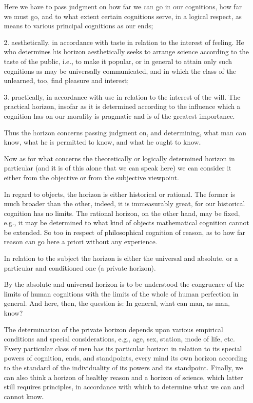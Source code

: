     Here we have to pass judgment on how far we can go in our cognitions,
    how far we must go, and to what extent certain cognitions serve,
    in a logical respect, as means to various principal cognitions as our ends;

    2. aesthetically, in accordance with taste
    in relation to the interest of feeling.
    He who determines his horizon aesthetically seeks
    to arrange science according to the taste of the public,
    i.e., to make it popular,
    or in general to attain only such cognitions
    as may be universally communicated,
    and in which the class of the unlearned, too,
    find pleasure and interest;

    3. practically, in accordance with use
    in relation to the interest of the will.
    The practical horizon, insofar as it is determined
    according to the influence which a cognition has
    on our morality is pragmatic
    and is of the greatest importance.

    Thus the horizon concerns passing judgment on,
    and determining,
    what man can know,
    what he is permitted to know,
    and what he ought to know.

    Now as for what concerns the theoretically
    or logically determined horizon in particular
    (and it is of this alone that we can speak here)
    we can consider it either from the objective
    or from the subjective viewpoint.

    In regard to objects, the horizon is either historical or rational.
    The former is much broader than the other,
    indeed, it is immeasurably great,
    for our historical cognition has no limits.
    The rational horizon, on the other hand, may be fixed,
    e.g., it may be determined to what kind of objects
    mathematical cognition cannot be extended.
    So too in respect of philosophical cognition of reason,
    as to how far reason can go here a priori without any experience.

    In relation to the subject the horizon is
    either the universal and absolute,
    or a particular and conditioned one (a private horizon).

    By the absolute and universal horizon is to be understood
    the congruence of the limits of human cognitions with
    the limits of the whole of human perfection in general.
    And here, then, the question is:
    In general, what can man, as man, know?

    The determination of the private horizon depends upon
    various empirical conditions and special considerations,
    e.g., age, sex, station, mode of life, etc.
    Every particular class of men has its particular horizon
    in relation to its special powers of cognition, ends, and standpoints,
    every mind its own horizon according to the standard of
    the individuality of its powers and its standpoint.
    Finally, we can also think a horizon of healthy reason
    and a horizon of science,
    which latter still requires principles,
    in accordance with which to determine
    what we can and cannot know.

